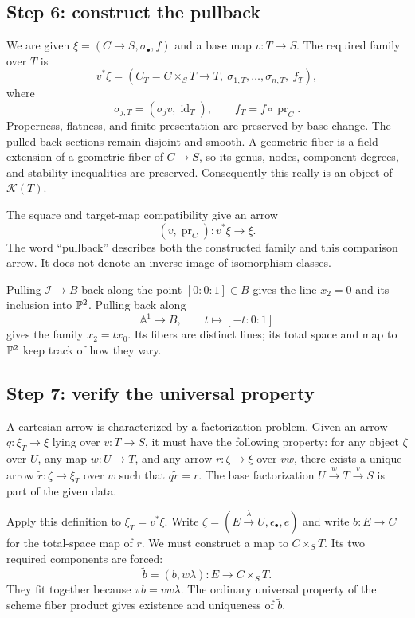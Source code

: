 \subsection{Step 6: construct the pullback}

We are given $\xi=(C\to S,\sigma_\bullet,f)$ and a base map $v:T\to S$. The required family over $T$ is
\[
 v^*\xi=(C_T=C\times_S T\longrightarrow T,\ \sigma_{1,T},\ldots,\sigma_{n,T},\ f_T),
\]
where
\[
 \sigma_{j,T}=(\sigma_jv,\operatorname{id}_T),\qquad
 f_T=f\circ\operatorname{pr}_C.
\]
Properness, flatness, and finite presentation are preserved by base change. The pulled-back sections remain disjoint and smooth. A geometric fiber is a field extension of a geometric fiber of $C\to S$, so its genus, nodes, component degrees, and stability inequalities are preserved. Consequently this really is an object of $\mathscr K(T)$.

The square and target-map compatibility give an arrow
\[
 (v,\operatorname{pr}_C):v^*\xi\longrightarrow\xi.
\]
The word ``pullback'' describes both the constructed family and this comparison arrow. It does not denote an inverse image of isomorphism classes.

\begin{Ex}
Pulling $\mathcal I\to B$ back along the point $[0:0:1]\in B$ gives the line $x_2=0$ and its inclusion into $\mathbb P^2$. Pulling back along
\[
 \mathbb A^1\longrightarrow B,\qquad t\longmapsto[-t:0:1]
\]
gives the family $x_2=t x_0$. Its fibers are distinct lines; its total space and map to $\mathbb P^2$ keep track of how they vary.
\end{Ex}

\subsection{Step 7: verify the universal property}

A cartesian arrow is characterized by a factorization problem. Given an arrow $q:\xi_T\to\xi$ lying over $v:T\to S$, it must have the following property: for any object $\zeta$ over $U$, any map $w:U\to T$, and any arrow $r:\zeta\to\xi$ over $vw$, there exists a unique arrow $\widetilde r:\zeta\to\xi_T$ over $w$ such that $q\widetilde r=r$. The base factorization $U\xrightarrow{w}T\xrightarrow{v}S$ is part of the given data.

Apply this definition to $\xi_T=v^*\xi$. Write $\zeta=(E\xrightarrow{\lambda}U,\epsilon_\bullet,e)$ and write $b:E\to C$ for the total-space map of $r$. We must construct a map to $C\times_S T$. Its two required components are forced:
\[
 \widetilde b=(b,w\lambda):E\longrightarrow C\times_S T.
\]
They fit together because $\pi b=vw\lambda$. The ordinary universal property of the scheme fiber product gives existence and uniqueness of $\widetilde b$.

